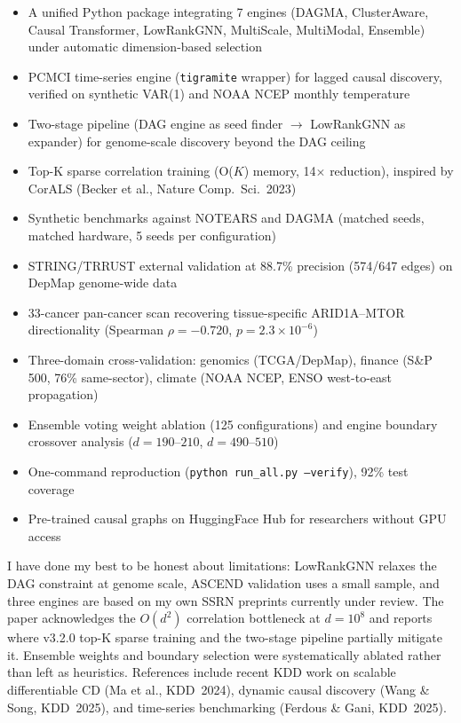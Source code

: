 \documentclass[11pt]{article}
\begin{document}
\begin{itemize}[nosep]
\item A unified Python package integrating 7 engines (DAGMA, ClusterAware, Causal Transformer, LowRankGNN, MultiScale, MultiModal, Ensemble) under automatic dimension-based selection
\item PCMCI time-series engine (\texttt{tigramite} wrapper) for lagged causal discovery, verified on synthetic VAR(1) and NOAA NCEP monthly temperature
\item Two-stage pipeline (DAG engine as seed finder $\to$ LowRankGNN as expander) for genome-scale discovery beyond the DAG ceiling
\item Top-K sparse correlation training (O($K$) memory, 14$\times$ reduction), inspired by CorALS (Becker et al., Nature Comp.\ Sci.\ 2023)
\item Synthetic benchmarks against NOTEARS and DAGMA (matched seeds, matched hardware, 5 seeds per configuration)
\item STRING/TRRUST external validation at 88.7\% precision (574/647 edges) on DepMap genome-wide data
\item 33-cancer pan-cancer scan recovering tissue-specific ARID1A--MTOR directionality (Spearman $\rho=-0.720$, $p=2.3{\times}10^{-6}$)
\item Three-domain cross-validation: genomics (TCGA/DepMap), finance (S\&P 500, 76\% same-sector), climate (NOAA NCEP, ENSO west-to-east propagation)
\item Ensemble voting weight ablation (125 configurations) and engine boundary crossover analysis ($d=190$--$210$, $d=490$--$510$)
\item One-command reproduction (\texttt{python run\_all.py --verify}), 92\% test coverage
\item Pre-trained causal graphs on HuggingFace Hub for researchers without GPU access
\end{itemize}

I have done my best to be honest about limitations: LowRankGNN relaxes the DAG constraint at genome scale, ASCEND validation uses a small sample, and three engines are based on my own SSRN preprints currently under review. The paper acknowledges the $O(d^2)$ correlation bottleneck at $d=10^8$ and reports where v3.2.0 top-K sparse training and the two-stage pipeline partially mitigate it. Ensemble weights and boundary selection were systematically ablated rather than left as heuristics. References include recent KDD work on scalable differentiable CD (Ma et al., KDD~2024), dynamic causal discovery (Wang \& Song, KDD~2025), and time-series benchmarking (Ferdous \& Gani, KDD~2025).
\end{document}
